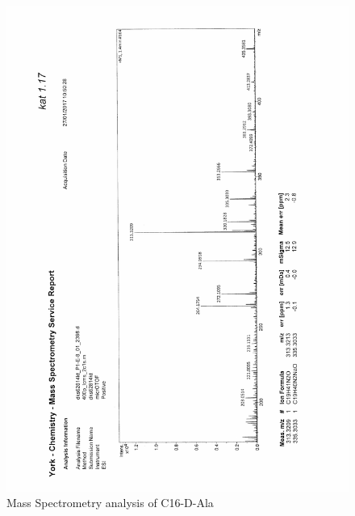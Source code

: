 \begin{figure}[ht!]
\centering
\includegraphics[scale=0.75]{Mass_Spec/KAT1_17.PDF}
\caption{Mass Spectrometry analysis of C16-D-Ala}
\end{figure}

